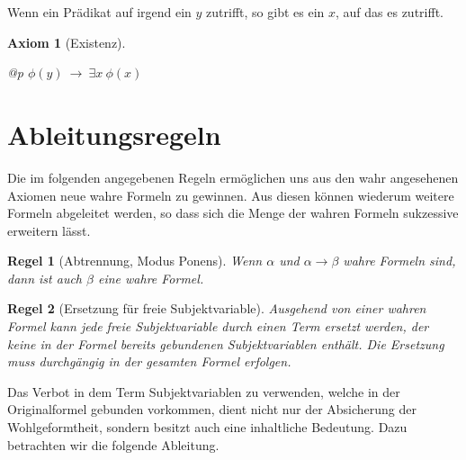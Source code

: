 \documentclass[a4paper,german,10pt,twoside]{book}
\newtheorem{ax}{Axiom}
\newtheorem{rul}{Regel}
\theoremstyle{definition}
\theoremstyle{remark}
\begin{document}
\par
Wenn ein Pr{\"a}dikat auf irgend ein $y$ zutrifft, so gibt es ein $x$, auf das es zutrifft.

\begin{ax}[Existenz]
\label{axiom:existencialGeneralization} \hypertarget{axiom:existencialGeneralization}{}
\mbox{}
\begin{longtable}{{@{\extracolsep{\fill}}p{\linewidth}}}
\centering $\phi(y)\ \rightarrow \ \exists x\ \phi(x)$
\end{longtable}

\end{ax}




\section{Ableitungsregeln} \label{chapter4_section1} \hypertarget{chapter4_section1}{}
Die im folgenden angegebenen Regeln erm{\"o}glichen uns aus den wahr angesehenen Axiomen neue wahre Formeln zu gewinnen. Aus diesen k{\"o}nnen wiederum weitere Formeln abgeleitet werden, so dass sich die Menge der wahren Formeln sukzessive erweitern l{\"a}sst.

\par


\begin{rul}[Abtrennung, Modus Ponens]
\label{rule:modusPonens} \hypertarget{rule:modusPonens}{}
Wenn $\alpha$ und $\alpha \rightarrow \beta$ wahre Formeln sind, dann ist auch $\beta$ eine wahre Formel.
\end{rul}




\par


\begin{rul}[Ersetzung f{\"u}r freie Subjektvariable]
\label{rule:replaceFree} \hypertarget{rule:replaceFree}{}
Ausgehend von einer wahren Formel kann jede freie Subjektvariable durch einen Term ersetzt werden, der keine in der Formel bereits gebundenen Subjektvariablen enth{\"a}lt. Die Ersetzung muss durchg{\"a}ngig in der gesamten Formel erfolgen.
\end{rul}

Das Verbot in dem Term Subjektvariablen zu verwenden, welche in der Originalformel gebunden vorkommen, dient nicht nur der Absicherung der Wohlgeformtheit, sondern besitzt auch eine inhaltliche Bedeutung. Dazu betrachten wir die folgende Ableitung.
\end{document}

